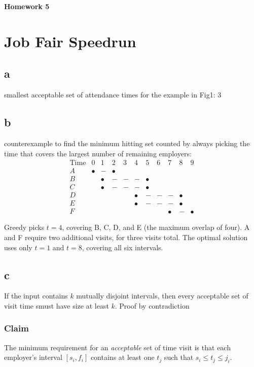 \documentclass[11pt]{article}
\begin{document}
	
\begin{center}
\Large{\textbf{Homework 5}}
\end{center}

\section{Job Fair Speedrun}
\subsection{a}
smallest acceptable set of attendance times for the example in Fig1: 3
\subsection{b}
counterexample to find the minimum hitting set counted by always picking the time that covers the largest number of remaining employers:
\[
\begin{array}{c|cccccccccc}
\text{Time} & 0 & 1 & 2 & 3 & 4 & 5 & 6 & 7 & 8 & 9 \\
\hline
A & \bullet & - & \bullet & & & & & & & \\
B & & \bullet & - & - & - & \bullet & & & & \\
C & & \bullet & - & - & - & \bullet & & & & \\
D & & & & & \bullet & - & - & - & \bullet & \\
E & & & & & \bullet & - & - & - & \bullet & \\
F & & & & & & & & \bullet & - & \bullet
\end{array}
\]

Greedy picks $t=4$, covering B, C, D, and E (the maximum overlap of four). A and F require two additional visits, for three visits total. The optimal solution uses only $t=1$ and $t=8$, covering all six intervals.

\subsection{c}
If the input contains $k$ mutually disjoint intervals, then every acceptable set of visit time smust have size at least $k$. 
Proof by contradiction
\subsubsection{Claim}
The minimum requirement for an \emph{acceptable} set of time visit is that each employer's interval $[s_i, f_i]$ contains at least one $t_j$ such that $s_i \le t_j \le j_i$. 
\end{document}
